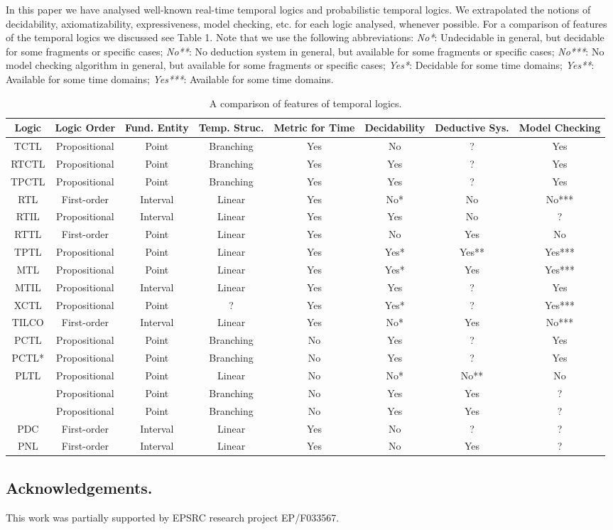\documentclass[11pt]{article}
\begin{document}
In this paper we have analysed well-known real-time temporal logics and probabilistic temporal logics. We extrapolated the notions of decidability, axiomatizability, expressiveness, model checking, etc. for each logic analysed, whenever possible. For a comparison of features of the temporal logics we discussed see Table 1. Note that we use the following abbreviations: \emph{No*}: Undecidable in general, but decidable for some fragments or specific cases; \emph{No**}: No deduction system in general, but available for some fragments or specific cases; \emph{No***}: No model checking algorithm in general, but available for some fragments or specific cases; \emph{Yes*}: Decidable for some time domains; \emph{Yes**}:  Available for some time domains; \emph{Yes***}: Available for some time domains.


\begin{landscape}
\begin{table}
\caption{A comparison of features of temporal logics.}
\centering
\small
\begin{tabular}{|c|c|c|c|c|c|c|c|}
\hline
\textbf{Logic} & \textbf{Logic Order} & \textbf{Fund. Entity} & \textbf{Temp. Struc.} &\textbf{Metric for Time} & \textbf{Decidability} & \textbf{Deductive Sys.} & \textbf{Model Checking}\tabularnewline\hline\hline
TCTL&Propositional&Point&Branching&Yes&No&?&Yes\tabularnewline\hline
RTCTL&Propositional&Point&Branching&Yes&Yes&?&Yes\tabularnewline\hline
TPCTL&Propositional&Point&Branching&Yes&Yes&?&Yes\tabularnewline\hline\hline
RTL&First-order&Interval&Linear&Yes&No*&No&No***\tabularnewline\hline
RTIL&Propositional&Interval&Linear&Yes&Yes&No&?\tabularnewline\hline
RTTL&First-order&Point&Linear&Yes&No&Yes&No\tabularnewline\hline
TPTL&Propositional&Point&Linear&Yes&Yes*&Yes**&Yes***\tabularnewline\hline
MTL&Propositional&Point&Linear&Yes&Yes*&Yes&Yes***\tabularnewline\hline
MTIL&Propositional&Interval&Linear&Yes&Yes&?&Yes\tabularnewline\hline
XCTL&Propositional&Point&?&Yes&Yes*&?&Yes***\tabularnewline\hline
TILCO&First-order&Interval&Linear&Yes&No*&Yes&No***\tabularnewline\hline\hline
PCTL&Propositional&Point&Branching&No&Yes&?&Yes\tabularnewline\hline
PCTL*&Propositional&Point&Branching&No&Yes&?&Yes\tabularnewline\hline
PLTL&Propositional&Point&Linear&No&No*&No**&No\tabularnewline\hline
&Propositional&Point&Branching&No&Yes&Yes&?\tabularnewline\hline
&Propositional&Point&Branching&No&Yes&Yes&?\tabularnewline\hline
PDC&First-order&Interval&Linear&Yes&No&?&?\tabularnewline\hline
PNL&First-order&Interval&Linear&Yes&No&Yes&?\tabularnewline\hline\hline
\end{tabular}
\end{table}
\end{landscape}

\subsection*{Acknowledgements.}
This work was partially supported by EPSRC research project EP/F033567.

            
\end{document}
